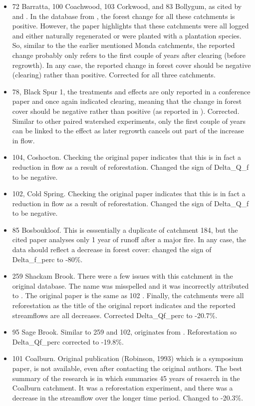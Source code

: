 \documentclass[]{elsarticle} %
\begin{document}
\begin{itemize}
\item
  72 Barratta, 100 Coachwood, 103 Corkwood, and 83 Bollygum, as cited by \citet{cornish1993} and \citet{cornish2001}. In the database from \citet{zhang2017}, the forest change for all these catchments is positive. However, the paper highlights that these catchments were all logged and either naturally regenerated or were planted with a plantation species. So, similar to the the earlier mentioned Monda catchments, the reported change probably only refers to the first couple of years after clearing (before regrowth). In any case, the reported change in forest cover should be negative (clearing) rather than positive. Corrected for all three catchments.
\item
  78, Black Spur 1, the treatments and effects are only reported in a conference paper \citep{jayasuriya1988} and once again indicated clearing, meaning that the change in forest cover should be negative rather than positive (as reported in \citet{zhang2017}). Corrected. Similar to other paired watershed experiments, only the first couple of years can be linked to the effect as later regrowth cancels out part of the increase in flow.
\item
  104, Coshocton. Checking the original paper indicates that this is in fact a reduction in flow as a result of reforestation. Changed the sign of Delta\_Q\_f to be negative.\\
\item
  102, Cold Spring. Checking the original paper \citep{schneider1961} indicates that this is in fact a reduction in flow as a result of reforestation. Changed the sign of Delta\_Q\_f to be negative.\\
\item
  85 Bosboukloof. This is esssentially a duplicate of catchment 184, but the cited paper analyses only 1 year of runoff after a major fire. In any case, the data should reflect a decrease in forest cover: changed the sign of Delta\_f\_perc to -80\%.
\item
  259 Shackam Brook. There were a few issues with this catchment in the original database. The name was misspelled and it was incorrectly attributed to \citet{brown2005}. The original paper is the same as 102 \citep{schneider1961}. Finally, the catchments were all reforestation as the title of the original report indicates and the reported streamflows are all decreases. Corrected Delta\_Qf\_perc to -20.7\%.
\item
  95 Sage Brook. Similar to 259 and 102, originates from \citet{schneider1961}. Reforestation so Delta\_Qf\_perc corrected to -19.8\%.
\item
  101 Coalburn. Original publication (Robinson, 1993) which is a symposium paper, is not available, even after contacting the original authors. The best summary of the research is in \citet{birkinshaw2014} which summaries 45 years of resaerch in the Coalburn catchment. It was a reforestation experiment, and there was a decrease in the streamflow over the longer time period. Changed to -20.3\%.
\end{itemize}
\end{document}
